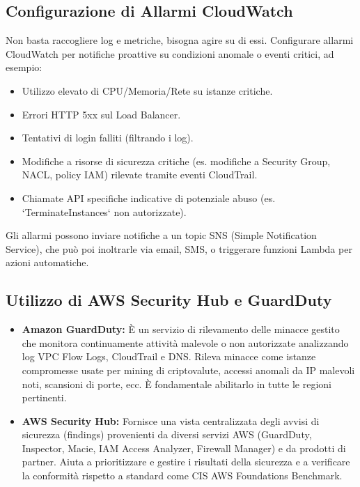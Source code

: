 \subsection{Configurazione di Allarmi CloudWatch}
\label{subsec:cloudwatch-alarms}
Non basta raccogliere log e metriche, bisogna agire su di essi. Configurare allarmi CloudWatch per notifiche proattive su condizioni anomale o eventi critici, ad esempio:
\begin{itemize}
    \item Utilizzo elevato di CPU/Memoria/Rete su istanze critiche.
    \item Errori HTTP 5xx sul Load Balancer.
    \item Tentativi di login falliti (filtrando i log).
    \item Modifiche a risorse di sicurezza critiche (es. modifiche a Security Group, NACL, policy IAM) rilevate tramite eventi CloudTrail.
    \item Chiamate API specifiche indicative di potenziale abuso (es. `TerminateInstances` non autorizzate).
\end{itemize}
Gli allarmi possono inviare notifiche a un topic SNS (Simple Notification Service), che può poi inoltrarle via email, SMS, o triggerare funzioni Lambda per azioni automatiche.

\subsection{Utilizzo di AWS Security Hub e GuardDuty}
\label{subsec:security-hub-guardduty}
\begin{itemize}
    \item \textbf{Amazon GuardDuty:} È un servizio di rilevamento delle minacce gestito che monitora continuamente attività malevole o non autorizzate analizzando log VPC Flow Logs, CloudTrail e DNS. Rileva minacce come istanze compromesse usate per mining di criptovalute, accessi anomali da IP malevoli noti, scansioni di porte, ecc. È fondamentale abilitarlo in tutte le regioni pertinenti.
    \item \textbf{AWS Security Hub:} Fornisce una vista centralizzata degli avvisi di sicurezza (findings) provenienti da diversi servizi AWS (GuardDuty, Inspector, Macie, IAM Access Analyzer, Firewall Manager) e da prodotti di partner. Aiuta a prioritizzare e gestire i risultati della sicurezza e a verificare la conformità rispetto a standard come CIS AWS Foundations Benchmark.
\end{itemize}

